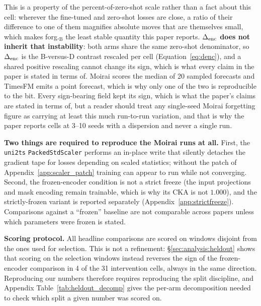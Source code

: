 This is a property of the percent-of-zero-shot scale rather than a fact about this
cell: wherever the fine-tuned and zero-shot losses are close, a ratio of their
difference to one of them magnifies absolute moves that are themselves small, which
makes forg.$_\text{B}$ the least stable quantity this paper reports.
\textbf{$\Delta_\text{enc}$ does not inherit that instability}: both arms share the same
zero-shot denominator, so $\Delta_\text{enc}$ is the B-versus-D contrast rescaled per cell
(Equation~\ref{eq:denc}), and a shared positive rescaling cannot change its sign,
which is what every claim in the paper is stated in terms of.
Moirai scores the median of 20 sampled forecasts and TimesFM emits a point
forecast, which is why only one of the two is reproducible to the bit.  Every
sign-bearing field kept its sign, which is what the paper's claims are stated in
terms of, but a reader should treat any single-seed Moirai forgetting figure as
carrying at least this much run-to-run variation, and that is why the paper
reports cells at 3--10 seeds with a dispersion and never a single run.

\textbf{Two things are required to reproduce the Moirai runs at all.}  First, the
\texttt{uni2ts} \texttt{PackedStdScaler} performs an in-place write that silently
detaches the gradient tape for losses depending on scaled statistics; without the
patch of Appendix~\ref{app:scaler_patch} training can appear to run while not
converging.  Second, the frozen-encoder condition is not a strict freeze (the
input projections and mask encoding remain trainable, which is why its CKA is not
$1.000$), and the strictly-frozen variant is reported separately
(Appendix~\ref{app:strictfreeze}).  Comparisons against a ``frozen'' baseline are
not comparable across papers unless which parameters were frozen is stated.

\textbf{Scoring protocol.}  All headline comparisons are scored on windows
disjoint from the ones used for selection.  This is not a refinement:
\S\ref{sec:analysis:heldout} shows that scoring on the selection windows instead
reverses the sign of the frozen-encoder comparison in 4 of the 31 intervention
cells, always in the same direction.  Reproducing our numbers therefore requires
reproducing the split discipline, and Appendix
Table~\ref{tab:heldout_decomp} gives the per-arm decomposition needed to check
which split a given number was scored on.

